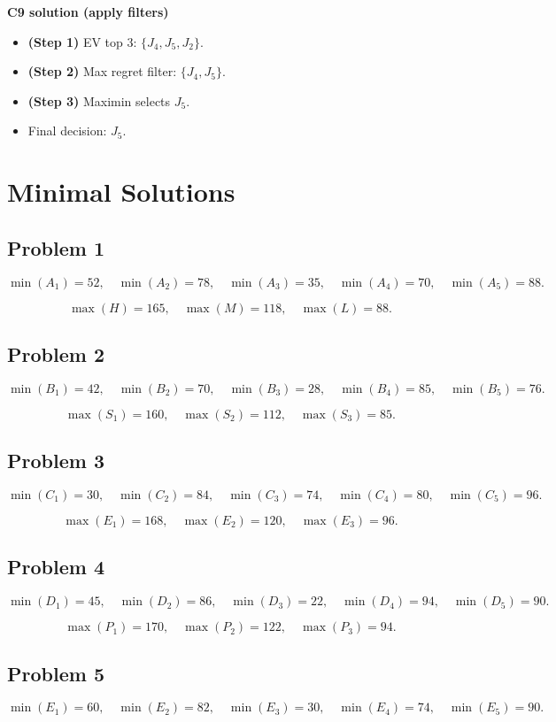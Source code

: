 \begin{ExamProblems}
		\textbf{C9 solution (apply filters)}\par
		\begin{itemize}
			\item \textbf{(Step 1)} EV top 3: $\{J_4,J_5,J_2\}$.
			\item \textbf{(Step 2)} Max regret filter: $\{J_4,J_5\}$.
			\item \textbf{(Step 3)} Maximin selects $J_5$.
			\item Final decision: $J_5$.
		\end{itemize}
		
	\end{ExamProblems}


\section{Minimal Solutions}

\subsection*{Problem 1}
\[\min(A_1)=52,\quad \min(A_2)=78,\quad \min(A_3)=35,\quad \min(A_4)=70,\quad \min(A_5)=88.\]

\[\max(H)=165,\quad \max(M)=118,\quad \max(L)=88.\]

\subsection*{Problem 2}
\[\min(B_1)=42,\quad \min(B_2)=70,\quad \min(B_3)=28,\quad \min(B_4)=85,\quad \min(B_5)=76.\]

\[\max(S_1)=160,\quad \max(S_2)=112,\quad \max(S_3)=85.\]

\subsection*{Problem 3}
\[\min(C_1)=30,\quad \min(C_2)=84,\quad \min(C_3)=74,\quad \min(C_4)=80,\quad \min(C_5)=96.\]

\[\max(E_1)=168,\quad \max(E_2)=120,\quad \max(E_3)=96.\]

\subsection*{Problem 4}
\[\min(D_1)=45,\quad \min(D_2)=86,\quad \min(D_3)=22,\quad \min(D_4)=94,\quad \min(D_5)=90.\]

\[\max(P_1)=170,\quad \max(P_2)=122,\quad \max(P_3)=94.\]

\subsection*{Problem 5}
\[\min(E_1)=60,\quad \min(E_2)=82,\quad \min(E_3)=30,\quad \min(E_4)=74,\quad \min(E_5)=90.\]

